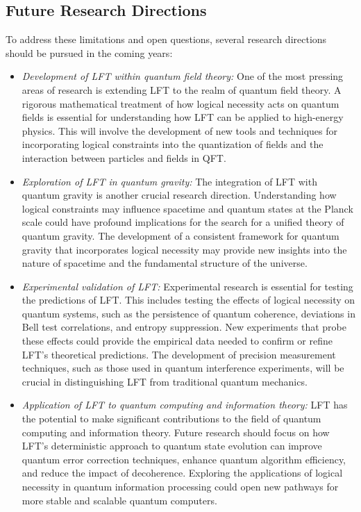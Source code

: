 \subsection{Future Research Directions}

To address these limitations and open questions, several research directions should be pursued in the coming years:

\begin{itemize}
    \item \textit{Development of LFT within quantum field theory:} One of the most pressing areas of research is extending LFT to the realm of quantum field theory. A rigorous mathematical treatment of how logical necessity acts on quantum fields is essential for understanding how LFT can be applied to high-energy physics. This will involve the development of new tools and techniques for incorporating logical constraints into the quantization of fields and the interaction between particles and fields in QFT.
    
    \item \textit{Exploration of LFT in quantum gravity:} The integration of LFT with quantum gravity is another crucial research direction. Understanding how logical constraints may influence spacetime and quantum states at the Planck scale could have profound implications for the search for a unified theory of quantum gravity. The development of a consistent framework for quantum gravity that incorporates logical necessity may provide new insights into the nature of spacetime and the fundamental structure of the universe.
    
    \item \textit{Experimental validation of LFT:} Experimental research is essential for testing the predictions of LFT. This includes testing the effects of logical necessity on quantum systems, such as the persistence of quantum coherence, deviations in Bell test correlations, and entropy suppression. New experiments that probe these effects could provide the empirical data needed to confirm or refine LFT’s theoretical predictions. The development of precision measurement techniques, such as those used in quantum interference experiments, will be crucial in distinguishing LFT from traditional quantum mechanics.
    
    \item \textit{Application of LFT to quantum computing and information theory:} LFT has the potential to make significant contributions to the field of quantum computing and information theory. Future research should focus on how LFT’s deterministic approach to quantum state evolution can improve quantum error correction techniques, enhance quantum algorithm efficiency, and reduce the impact of decoherence. Exploring the applications of logical necessity in quantum information processing could open new pathways for more stable and scalable quantum computers.
    

\end{itemize}
